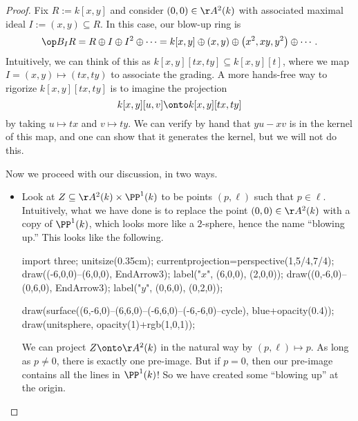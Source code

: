 \begin{proof}
	Fix $R:=k[x,y]$ and consider $(0,0)\in\AA^2(k)$ with associated maximal ideal $I:=(x,y)\subseteq R$. In this case, our blow-up ring is
	\[\op B_IR=R\oplus I\oplus I^2\oplus\cdots=k[x,y]\oplus(x,y)\oplus\left(x^2,xy,y^2\right)\oplus\cdots.\]
	Intuitively, we can think of this as $k[x,y][tx,ty]\subseteq k[x,y][t]$, where we map $I=(x,y)\mapsto(tx,ty)$ to associate the grading. A more hands-free way to rigorize $k[x,y][tx,ty]$ is to imagine the projection
	\[k[x,y][u,v]\onto k[x,y][tx,ty]\]
	by taking $u\mapsto tx$ and $v\mapsto ty$. We can verify by hand that $yu-xv$ is in the kernel of this map, and one can show that it generates the kernel, but we will not do this.

	Now we proceed with our discussion, in two ways.
	\begin{itemize}
		\item Look at $Z\subseteq\AA^2(k)\times\PP^1(k)$ to be points $(p,\ell)$ such that $p\in\ell$. Intuitively, what we have done is to replace the point $(0,0)\in\AA^2(k)$ with a copy of $\PP^1(k)$, which looks more like a $2$-sphere, hence the name ``blowing up.'' This looks like the following.
		\begin{center}
			\begin{asy}
				import three;
				unitsize(0.35cm);
				currentprojection=perspective(1,5/4,7/4);
				draw((-6,0,0)--(6,0,0), EndArrow3);
				label("$x$", (6,0,0), (2,0,0));
				draw((0,-6,0)--(0,6,0), EndArrow3);
				label("$y$", (0,6,0), (0,2,0));
	
				draw(surface((6,-6,0)--(6,6,0)--(-6,6,0)--(-6,-6,0)--cycle), blue+opacity(0.4));
				draw(unitsphere, opacity(1)+rgb(1,0,1));
			\end{asy}
		\end{center}
		We can project $Z\onto\AA^2(k)$ in the natural way by $(p,\ell)\mapsto p$. As long as $p\ne0$, there is exactly one pre-image. But if $p=0$, then our pre-image contains all the lines in $\PP^1(k)$! So we have created some ``blowing up'' at the origin.


\end{itemize}
\end{proof}

